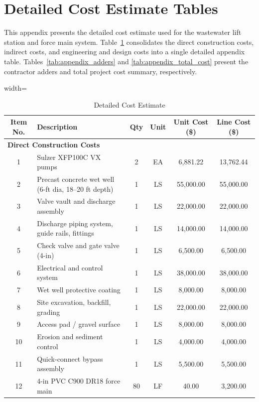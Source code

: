 \documentclass[letterpaper,12pt]{report} %
\begin{document}
\section{Detailed Cost Estimate Tables}

This appendix presents the detailed cost estimate used for the wastewater lift station and force main system. Table~\ref{tab:appendix_cost_detail} consolidates the direct construction costs, indirect costs, and engineering and design costs into a single detailed appendix table. Tables~\ref{tab:appendix_adders} and \ref{tab:appendix_total_cost} present the contractor adders and total project cost summary, respectively.

\begin{table}[H]
\centering
\caption{Detailed Cost Estimate}
\label{tab:appendix_cost_detail}
\begin{adjustbox}{width=\textwidth}
\begin{tabular}{c l c c c c}
\toprule
\textbf{Item No.} & \textbf{Description} & \textbf{Qty} & \textbf{Unit} & \textbf{Unit Cost (\$)} & \textbf{Line Cost (\$)} \\
\midrule
\multicolumn{6}{l}{\textbf{Direct Construction Costs}} \\
\midrule
1  & Sulzer XFP100C VX pumps & 2 & EA & 6,881.22 & 13,762.44 \\
2  & Precast concrete wet well (6-ft dia, 18--20 ft depth) & 1 & LS & 55,000.00 & 55,000.00 \\
3  & Valve vault and discharge assembly & 1 & LS & 22,000.00 & 22,000.00 \\
4  & Discharge piping system, guide rails, fittings & 1 & LS & 14,000.00 & 14,000.00 \\
5  & Check valve and gate valve (4-in) & 1 & LS & 6,500.00 & 6,500.00 \\
6  & Electrical and control system & 1 & LS & 38,000.00 & 38,000.00 \\
7  & Wet well protective coating & 1 & LS & 8,000.00 & 8,000.00 \\
8  & Site excavation, backfill, grading & 1 & LS & 22,000.00 & 22,000.00 \\
9  & Access pad / gravel surface & 1 & LS & 8,000.00 & 8,000.00 \\
10 & Erosion and sediment control & 1 & LS & 4,000.00 & 4,000.00 \\
11 & Quick-connect bypass assembly & 1 & LS & 5,500.00 & 5,500.00 \\
12 & 4-in PVC C900 DR18 force main & 80 & LF & 40.00 & 3,200.00 \\

\end{tabular}
\end{adjustbox}
\end{table}
\end{document}
